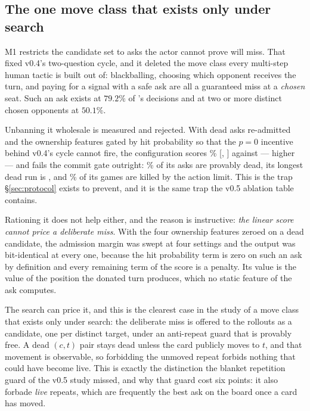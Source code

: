 \begin{table}[t]\centering
\caption{Search deviation rate against the deviation threshold. A healthy search moves a small
percentage of decisions; this one either moves a third of them or none.}
\label{tab:searchdev}

\end{table}



\subsection{The one move class that exists only under search}
\label{sec:search-deadask}

M1 restricts the candidate set to asks the actor cannot prove will miss. That fixed v0.4's
two-question cycle, and it deleted the move class every multi-step human tactic is built out of:
blackballing, choosing which opponent receives the turn, and paying for a signal with a safe ask are
all a guaranteed miss at a \emph{chosen} seat. Such an ask exists at $79.2\%$ of \vfive{}'s
decisions and at two or more distinct chosen opponents at $50.1\%$.

Unbanning it wholesale is measured and rejected. With dead asks re-admitted and the ownership
features gated by hit probability so that the $p=0$ incentive behind v0.4's cycle cannot fire, the
configuration scores \vsixDeadWin\% [\vsixDeadWinLo, \vsixDeadWinHi] against \vfive{} --- higher ---
and fails the commit gate outright: \vsixDeadPathDead\% of its asks are provably dead, its longest
dead run is \vsixDeadPathLongest{}, and \vsixDeadPathLimit\% of its games are killed by the action
limit. This is the trap \S\ref{sec:protocol} exists to prevent, and it is the same trap the v0.5
ablation table contains.

Rationing it does not help either, and the reason is instructive: \emph{the linear score cannot
price a deliberate miss}. With the four ownership features zeroed on a dead candidate, the admission
margin was swept at four settings and the output was bit-identical at every one, because the hit
probability term is zero on such an ask by definition and every remaining term of the score is a
penalty. Its value is the value of the position the donated turn produces, which no static feature
of the ask computes.

The search can price it, and this is the clearest case in the study of a move class that exists only
under search: the deliberate miss is offered to the rollouts as a candidate, one per distinct target,
under an anti-repeat guard that is provably free. A dead $(c,t)$ pair stays dead unless the card
publicly moves to $t$, and that movement is observable, so forbidding the unmoved repeat forbids
nothing that could have become live. This is exactly the distinction the blanket repetition guard of
the v0.5 study missed, and why that guard cost six points: it also forbade \emph{live} repeats, which
are frequently the best ask on the board once a card has moved.

